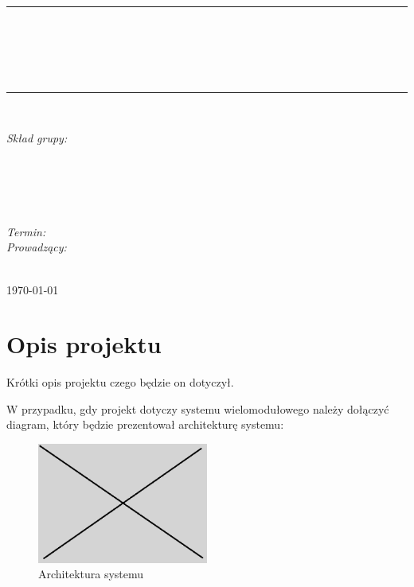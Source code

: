 \documentclass[10pt, a4paper]{article}
\begin{document}
\def\tablename{Tabela}	%

\begin{titlepage}
	\begin{center}
		\textsc{\LARGE \formakursu}\\[1cm]		
		\textsc{\Large \kurs}\\[0.5cm]		
		\rule{\textwidth}{0.08cm}\\[0.4cm]
		{\huge \bfseries \doctype}\\[1cm]
		{\huge \bfseries \projectname}\\[0.5cm]
		{\huge \bfseries \acronim}\\[0.4cm]
		\rule{\textwidth}{0.08cm}\\[1cm]
		
		\begin{flushright} \large
		\emph{Skład grupy:}\\
		\osobaA\\
		\osobaB\\
		\osobaC\\
		\osobaD\\
		\osobaE\\[0.4cm]
		
		\emph{Termin: }\termin\\[0.4cm]

		\emph{Prowadzący:} \\
		\prowadzacy \\
		
		\end{flushright}
		
		\vfill
		
		{\large \today}
	\end{center}	
\end{titlepage}

\newpage
\tableofcontents
\newpage

\section{Opis projektu}
\label{sec:OpisProjektu}

Krótki opis projektu czego będzie on dotyczył.

W przypadku, gdy projekt dotyczy systemu 
wielomodułowego należy dołączyć diagram, który będzie prezentował
architekturę systemu:

\begin{figure}[H]
	\centering
	\includegraphics[width=0.5\textwidth]{figures/obraz.png}
	\caption{Architektura systemu}
	\label{fig:Architektura}
\end{figure}
\end{document}
